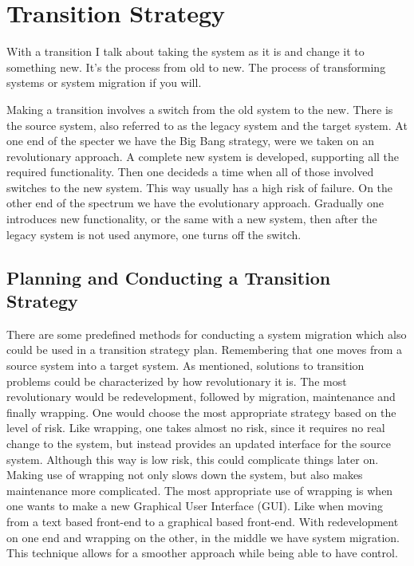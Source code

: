 \section{Transition Strategy}
With a transition I talk about taking the system as it is and change it to something new. 
It's the process from old to new. The process of transforming systems or system migration if you will.

Making a transition involves a switch from the old system to the new. There
is the source system, also referred to as the legacy system and the target
system. At one end of the specter we have the Big Bang strategy, were we
taken on an revolutionary approach. A complete new system is developed,
supporting all the required functionality. Then one decideds a time when all
of those involved switches to the new system. This way usually has a high
risk of failure. On the other end of the spectrum we have the evolutionary
approach. Gradually one introduces new functionality, or the same with a
new system, then after the legacy system is not used anymore, one turns off
the switch.

\subsection{Planning and Conducting a Transition Strategy}
There are some predefined methods for conducting a system migration which
also could be used in a transition strategy plan. Remembering that one
moves from a source system into a target system. As mentioned, solutions to
transition problems could be characterized by how revolutionary it is. The
most revolutionary would be redevelopment, followed by migration, maintenance and finally wrapping. One would choose the most appropriate strategy based on the level of risk. 
Like wrapping, one takes almost no risk, since it requires no real change to the system, but instead provides an updated interface for the source system. Although this way is low risk, this could complicate things later on. Making use of wrapping not only slows down the system,
but also makes maintenance more complicated. The most appropriate use of
wrapping is when one wants to make a new Graphical User Interface (GUI).
Like when moving from a text based front-end to a graphical based front-end.
With redevelopment on one end and wrapping on the other, in the middle we
have system migration. This technique allows for a smoother approach while
being able to have control.

